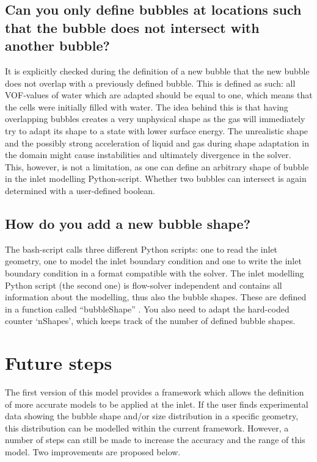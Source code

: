 \documentclass[fleqn,10pt,a4paper,twoside,english]{book}
\begin{document}
\subsection{Can you only define bubbles at locations such that the bubble does not intersect with another bubble?}
It is explicitly checked during the definition of a new bubble that the new bubble does not overlap with a previously defined bubble. This is defined as such: all VOF-values of water which are adapted should be equal to one, which means that the cells were initially filled with water. The idea behind this is that having overlapping bubbles creates a very unphysical shape as the gas will immediately try to adapt its shape to a state with lower surface energy. The unrealistic shape and the possibly strong acceleration of liquid and gas during shape adaptation in the domain might cause instabilities and ultimately divergence in the solver. This, however, is not a limitation, as one can define an arbitrary shape of bubble in the inlet modelling Python-script. Whether two bubbles can intersect is again determined with a user-defined boolean. 
\subsection{How do you add a new bubble shape?}
The bash-script calls three different Python scripts: one to read the inlet geometry, one to model the inlet boundary condition and one to write the inlet boundary condition in a format compatible with the solver. The inlet modelling Python script (the second one) is flow-solver independent and contains all information about the modelling, thus also the bubble shapes. These are defined in a function called “bubbleShape” . You also need to adapt the hard-coded counter ‘nShapes’, which keeps track of the number of defined bubble shapes.
\section{Future steps}
The first version of this model provides a framework which allows the definition of more accurate models to be applied at the inlet. If the user finds experimental data showing the bubble shape and/or size distribution in a specific geometry, this distribution can be modelled within the current framework. However, a number of steps can still be made to increase the accuracy and the range of this model. Two improvements are proposed below.
\end{document}
